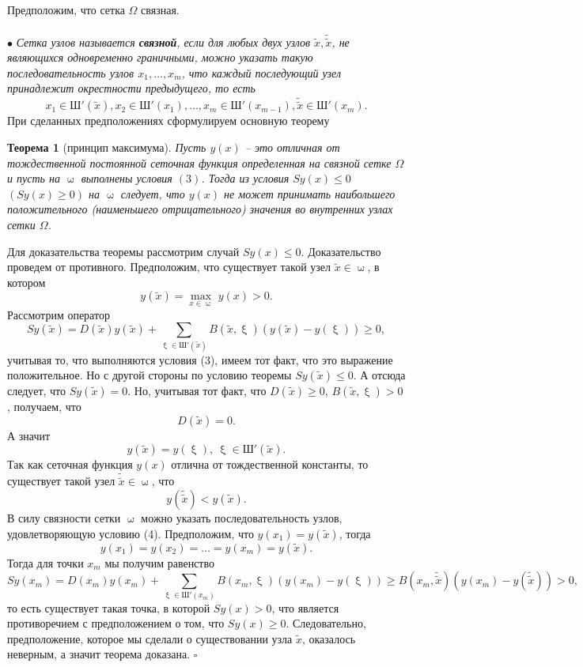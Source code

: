 \documentclass[a4paper, 12pt]{report}
\numberwithin{equation}{section}
\newenvironment{Proof} %
{\par\noindent{$\blacklozenge$}} %
{\hfill$\scriptstyle\square$}
\renewcommand{\leq}{\leqslant}
\renewcommand{\geq}{\geqslant}
\renewcommand{\omega}{\upomega}
\renewcommand{\xi}{\upxi}
\newtheorem*{theorem}{Теорема}
\begin{document}
	Предположим, что сетка $\Omega$ связная.\\\\
	$\bullet$ \textit{Сетка узлов называется \textbf{связной}, если для любых двух узлов $\tilde x, \tilde{\tilde{x}}$, не являющихся одновременно граничными, можно указать такую последовательность узлов $x_1,\ldots, x_m$, что каждый последующий узел принадлежит окрестности предыдущего, то есть} 
	\begin{equation}
		x_1 \in \text{Ш}'(\tilde x), x_2 \in \text{Ш}'(x_1),\ldots, x_m \in \text{Ш}'(x_{m-1}), \tilde{\tilde x} \in \text{Ш}'(x_m).
	\end{equation}
	При сделанных предположениях сформулируем основную теорему
	\begin{theorem}
		[принцип максимума]
		Пусть $y(x)$ -- это отличная от тождественной постоянной сеточная функция определенная на связной сетке $\Omega$ и пусть на $\omega$ выполнены условия $(3)$. Тогда из условия $S y(x) \leq 0$ $(Sy(x) \geq 0)$ на $\omega$ следует, что $y(x)$ не может принимать наибольшего положительного (наименьшего отрицательного) значения во внутренних узлах сетки $\Omega$.
	\end{theorem}
	\begin{Proof}
		Для доказательства теоремы рассмотрим случай $Sy(x) \leq 0$. Доказательство проведем от противного. Предположим, что существует такой узел $\tilde x \in \omega$, в котором $$y(\tilde x) = \underset{x \in \omega}{\max}\ y(x) > 0.$$
		Рассмотрим оператор $$Sy(\tilde x) = D(\tilde x) y(\tilde x) + \sum_{\xi \in \text{Ш}'(\tilde x)} B(\tilde x, \xi) (y(\tilde x) - y(\xi))\geq 0,$$
	 учитывая то, что выполняются условия (3), имеем тот факт, что это выражение положительное. Но с другой стороны по условию теоремы $Sy(\tilde x) \leq 0$. А отсюда следует, что $S y(\tilde x) = 0$. Но, учитывая тот факт, что $D(\tilde x)\geq 0$, $B (\tilde x, \xi) > 0$, получаем, что $$D(\tilde x) = 0.$$ А значит $$y(\tilde x) = y(\xi),\ \xi \in \text{Ш}'(\tilde x).$$
	 Так как сеточная функция $y(x)$ отлична от тождественной константы, то существует такой узел $\tilde{\tilde x}\in \omega$, что $$y(\tilde{\tilde x})<y(\tilde x).$$
	 В силу связности сетки $\omega$ можно указать последовательность узлов, удовлетворяющую условию (4). Предположим, что $y(x_1) = y(\tilde x)$, тогда 
	 $$y(x_1) = y(x_2) = \ldots = y(x_m) = y(\tilde x).$$
	 Тогда для точки $x_m$ мы получим равенство
	 $$Sy(x_m) = D(x_m) y(x_m) + \sum_{\xi \in \text{Ш}'(x_m)} B(x_m, \xi) (y(x_m) - y(\xi))\geq B(x_m, \tilde{\tilde x}) (y(x_m) - y(\tilde{\tilde x}))> 0,$$
	 то есть существует такая точка, в которой $Sy(x)>0$, что является противоречием с предположением о том, что $Sy(x) \geq 0$. Следовательно, предположение, которое мы сделали о существовании узла $\tilde x$, оказалось неверным, а значит теорема доказана.
	\end{Proof}\\\\
\end{document}
